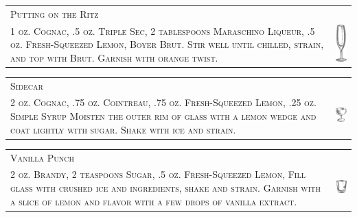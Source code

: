 \documentclass{article}
\begin{document}
\begin{tabular}{b{2.5in} m{0.625in}}
  \multicolumn{2}{p{3.0in}}{\centering\Huge\textsc{Putting on the Ritz}} \\ 
  
  \textsc{1 oz. Cognac, .5 oz. Triple Sec, 2 tablespoons Maraschino
    Liqueur, .5 oz. Fresh-Squeezed Lemon, Boyer Brut. Stir well until
    chilled, strain, and top with Brut. Garnish with orange twist.} &
  \includegraphics[width=0.5in]{flute.png}
\end{tabular}

\begin{tabular}{b{2.5in} m{0.625in}}
  \multicolumn{2}{p{3.0in}}{\centering\Huge\textsc{Sidecar}} \\ 
  
  \textsc{2 oz. Cognac, .75 oz. Cointreau, .75 oz.  Fresh-Squeezed
    Lemon, .25 oz. Simple Syrup Moisten the outer rim of glass with a
    lemon wedge and coat lightly with sugar. Shake with ice and
    strain.} & \includegraphics[width=0.5in]{coupe.png}
\end{tabular}

\begin{tabular}{b{2.5in} m{0.625in}}
  \multicolumn{2}{p{3.0in}}{\centering\Huge\textsc{Vanilla Punch}} \\ 
  
  \textsc{2 oz. Brandy, 2 teaspoons Sugar, .5 oz. Fresh-Squeezed
    Lemon, Fill glass with crushed ice and ingredients, shake and
    strain. Garnish with a slice of lemon and flavor with a few drops
    of vanilla extract.} & \includegraphics[width=0.5in]{rocks_glass.png}
\end{tabular}
\end{document}
